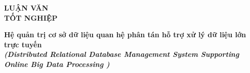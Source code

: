 \documentclass{article}[14pt]
\begin{document}
    \begin{figure}[h]
        \begin{floatrow}
        {%
    
        }
        {%
    
        }
        \end{floatrow}
    \end{figure}
    
    \begin{center}
        
        \textbf{\Large LUẬN VĂN \\  TỐT NGHIỆP} \\ 
    \end{center}
    
    
    \begin{center}
        
        \textbf{\huge Hệ quản trị cơ sở dữ liệu quan hệ phân tán hỗ trợ xử lý dữ liệu lớn trực tuyến } 
        \\
        
    \vspace{.5cm}
        \textit{\textbf{\Large (Distributed Relational Database Management System Supporting Online Big Data Processing  )}}
    \end{center}
    
\end{document}
